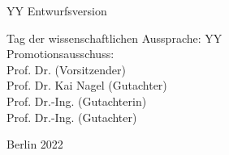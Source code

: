 \begin{flushright}
	YY Entwurfsversion \\

	\hrulefill

 	Tag der wissenschaftlichen Aussprache: YY  \\

	\vspace{5mm}
	Promotionsausschuss:\\
	Prof. Dr. (Vorsitzender)\\
    	Prof. Dr. Kai Nagel (Gutachter)\\
    	Prof. Dr.-Ing.  (Gutachterin)\\
     	Prof. Dr.-Ing. (Gutachter)\\
	\vspace{6mm}

	Berlin 2022\\

\end{flushright}